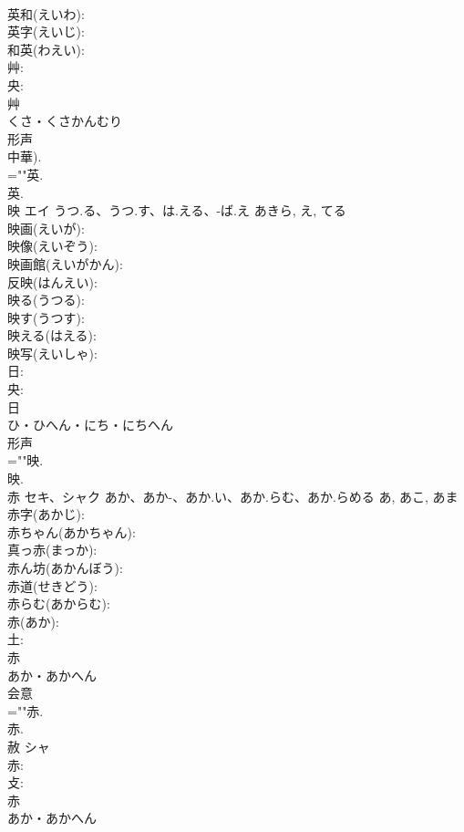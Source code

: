 \documentclass[8pt]{extreport}
\begin{document}
\begin{CJK}{UTF8}{min}
\\	英和(えいわ): 
\\	英字(えいじ): 
\\	和英(わえい): 
\\	艸: 
\\	央: 
\\	艸	
\\	くさ・くさかんむり	
\\	形声 
\\	中華).	
\\	=""英.
\\	英.
\\	映	エイ	うつ.る、うつ.す、は.える、-ば.え	あきら, え, てる	
\\	映画(えいが): 
\\	映像(えいぞう): 
\\	映画館(えいがかん): 
\\	反映(はんえい): 
\\	映る(うつる): 
\\	映す(うつす): 
\\	映える(はえる): 
\\	映写(えいしゃ): 
\\	日: 
\\	央: 
\\	日	
\\	ひ・ひへん・にち・にちへん	
\\	形声 
\\	=""映.
\\	映.
\\	赤	セキ、シャク	あか、あか-、あか.い、あか.らむ、あか.らめる	あ, あこ, あま	
\\	赤字(あかじ): 
\\	赤ちゃん(あかちゃん): 
\\	真っ赤(まっか): 
\\	赤ん坊(あかんぼう): 
\\	赤道(せきどう): 
\\	赤らむ(あからむ): 
\\	赤(あか): 
\\	土: 
\\	赤	
\\	あか・あかへん	
\\	会意 
\\	=""赤.
\\	赤.
\\	赦	シャ			
\\	赤: 
\\	攴: 
\\	赤	
\\	あか・あかへん	

\end{CJK}
\end{document}
